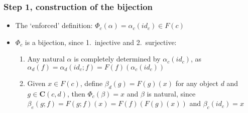 \documentclass[handout]{beamer}
\newcommand{\redc}{{\color{red} c}}
\newcommand{\bfsf}[1]{{\boldsymbol{#1}}}
\newcommand{\CC}{\bfsf{C}}
\begin{document}
\frame
  {   
    \frametitle{Step 1, construction of the bijection}\label{Yon:bijection}

 \begin{itemize}[<+->]
\item The `enforced' definition: $\Phi_c(\alpha) = \alpha_c(id_c) \in F(c)$
\item $\Phi_c$ is a bijection, since 1.\ injective and 2.\ surjective:
 \begin{enumerate}
    \item Any natural $\alpha$ is completely determined by $\alpha_c(id_c)$, 
as $\alpha_d(f)=\alpha_d(id_c;f)=F(f)(\alpha_c(id_c))$
    \item Given $x\in F(c)$, define $\beta_d(g)=F(g)(x)$ for any object $d$ 
and $g\in\CC(c,d)$, then $\Phi_c(\beta)=x$ and $\beta$ is natural,
since $\beta_e(g;f)=F(g;f)(x) = F(f)(F(g)(x))$ and $\beta_c(id_c) = x$

\end{enumerate}
 \end{itemize}

 }
\end{document}
